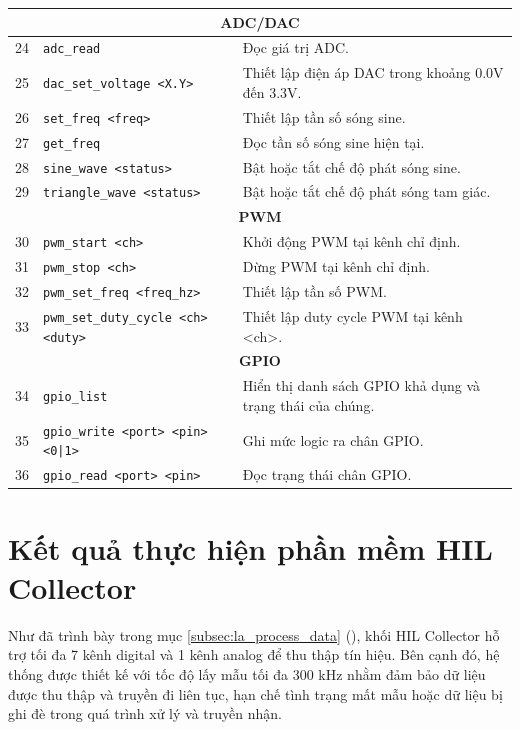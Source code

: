\begin{longtable}{|c|p{4.8cm}|p{7.2cm}|}
\multicolumn{3}{|c|}{\textbf{ADC/DAC}} \\
\hline

24
& \texttt{adc\_read}
& Đọc giá trị ADC. \\
\hline

25
& \texttt{dac\_set\_voltage <X.Y>}
& Thiết lập điện áp DAC trong khoảng 0.0V đến 3.3V. \\
\hline

26
& \texttt{set\_freq <freq>}
& Thiết lập tần số sóng sine. \\
\hline

27
& \texttt{get\_freq}
& Đọc tần số sóng sine hiện tại. \\
\hline

28
& \texttt{sine\_wave <status>}
& Bật hoặc tắt chế độ phát sóng sine. \\
\hline

29
& \texttt{triangle\_wave <status>}
& Bật hoặc tắt chế độ phát sóng tam giác. \\
\hline

\multicolumn{3}{|c|}{\textbf{PWM}} \\
\hline

30
& \texttt{pwm\_start <ch>}
& Khởi động PWM tại kênh chỉ định. \\
\hline

31
& \texttt{pwm\_stop <ch>}
& Dừng PWM tại kênh chỉ định. \\
\hline

32
& \texttt{pwm\_set\_freq <freq\_hz>}
& Thiết lập tần số PWM. \\
\hline

33
& \texttt{pwm\_set\_duty\_cycle <ch> <duty>}
& Thiết lập duty cycle PWM tại kênh <ch>. \\
\hline

\multicolumn{3}{|c|}{\textbf{GPIO}} \\
\hline

34
& \texttt{gpio\_list}
& Hiển thị danh sách GPIO khả dụng và trạng thái của chúng. \\
\hline

35
& \texttt{gpio\_write <port> <pin> <0|1>}
& Ghi mức logic ra chân GPIO. \\
\hline

36
& \texttt{gpio\_read <port> <pin>}
& Đọc trạng thái chân GPIO. \\
\hline

\end{longtable}

\section{Kết quả thực hiện phần mềm HIL Collector}
Như đã trình bày trong mục \ref{subsec:la_process_data} (), khối HIL Collector hỗ trợ tối đa 7 kênh digital và 1 kênh analog để thu thập tín hiệu.
Bên cạnh đó, hệ thống được thiết kế với tốc độ lấy mẫu tối đa 300 kHz nhằm đảm bảo dữ liệu được thu thập và truyền đi liên tục, hạn chế tình trạng mất mẫu hoặc dữ liệu bị ghi đè trong quá trình xử lý và truyền nhận.

